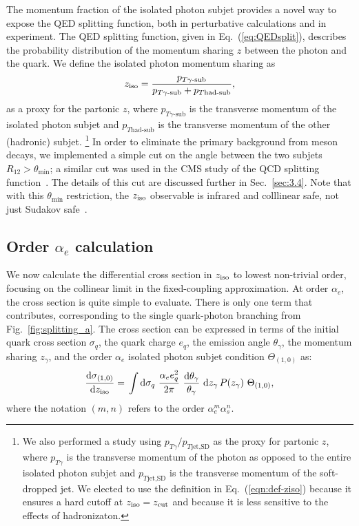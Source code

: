 \documentclass[a4paper,11pt]{article}
\DeclareRobustCommand{\Sec}[1]{Sec.~\ref{#1}}
\DeclareRobustCommand{\Fig}[1]{Fig.~\ref{#1}}
\DeclareRobustCommand{\Eq}[1]{Eq.~(\ref{#1})}
\newcommand{\ziso}{z_{\rm iso}}
\begin{document}
The momentum fraction of the isolated photon subjet provides a novel way to expose the QED splitting function, both in perturbative calculations and in experiment. 
%
The QED splitting function, given in \Eq{eq:QEDsplit}, describes the probability distribution of the momentum sharing $z$ between the photon and the quark.
%
We define the isolated photon momentum sharing as
%
\begin{equation}
\label{eqn:def-ziso}
\ziso = \frac{p_{T \text{$\gamma$-sub}}}{p_{T\text{$\gamma$-sub}} + p_{T \text{had-sub}}},
\end{equation}
%
as a proxy for the partonic $z$, where $p_{T \text{$\gamma$-sub}}$ is the transverse momentum of the isolated photon subjet and $p_{T \text{had-sub}}$ is the transverse momentum of the other (hadronic) subjet.%
\footnote{
	We also performed a study using $p_{T \gamma}/p_{T\text{jet,SD}}$ as the proxy for partonic $z$, where $p_{T \gamma}$ is the transverse momentum of the photon as opposed to the entire isolated photon subjet and $p_{T\text{jet,SD}}$ is the transverse momentum of the soft-dropped jet. We elected to use the definition in \Eq{eqn:def-ziso} because it ensures a hard cutoff at $\ziso = z_{\rm cut}$ and because it is less sensitive to the effects of hadronizaton.
}
%
In order to eliminate the primary background from meson decays, we implemented a simple cut on the angle between the two subjets $R_{12} > \theta_{\text{min}}$; a similar cut was used in the CMS study of the QCD splitting function~\cite{Sirunyan:2017bsd}.
%
The details of this cut are discussed further in \Sec{sec:3.4}.
%
Note that with this $\theta_{\text{min}}$ restriction, the $\ziso$ observable is infrared and colllinear safe, not just Sudakov safe~\cite{Larkoski:2013paa,Larkoski:2015lea}.

\subsection{Order $\alpha_e$ calculation}
\label{sec:3.2}

We now calculate the differential cross section in $\ziso$ to lowest non-trivial order, focusing on the collinear limit in the fixed-coupling approximation.
%
At order $\alpha_e$, the cross section is quite simple to evaluate.
%
There is only one term that contributes, corresponding to the single quark-photon branching from \Fig{fig:splitting_a}.
%
The cross section can be expressed in terms of the initial quark cross section $\sigma_q$, the quark charge $e_q$, the emission angle $\theta_{\gamma}$, the momentum sharing $z_{\gamma}$, and the order $\alpha_e$ isolated photon subjet condition $\Theta_{(1,0)} $ as:
%
\begin{equation}
\label{eq:lowestordercrosssection}
    \frac{\text{d}\sigma_{(1,0)}}{\text{d} \ziso} = \,
    \int \text{d}\sigma_q \,\, \frac{\alpha_e e_q^2}{2 \pi} \,\,\frac{\text{d} \theta_{\gamma}}{\theta_{\gamma}} \,\, \text{d} z_{\gamma} \, P(z_{\gamma})\,\,\Theta_{(1,0)} ,
\end{equation}
%
where the notation $(m,n)$ refers to the order $\alpha_e^m \alpha_s^n$.
\end{document}

